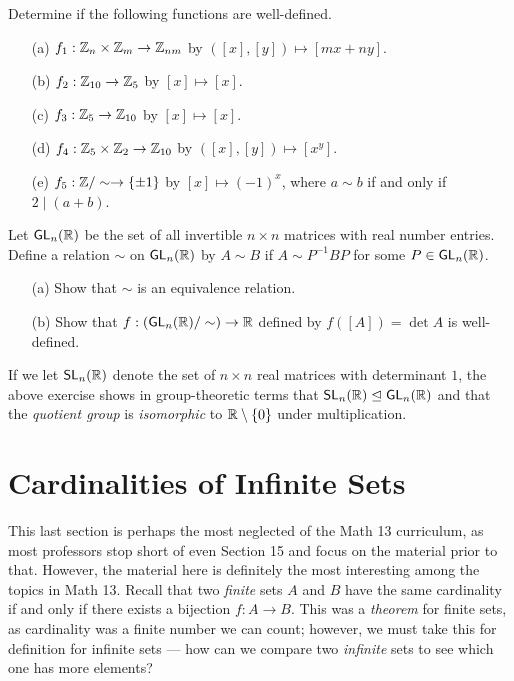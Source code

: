 \documentclass{article}
\begin{document}
\begin{exercise}
Determine if the following functions are well-defined.
\begin{itemize}
    \item[(a)] $f_1: \mathbb Z_n\times \mathbb Z_m \to \mathbb Z_{nm}$ by $([x], [y]) \mapsto [mx+ny]$.
    \item[(b)] $f_2: \mathbb Z_{10}\to\mathbb Z_5$ by $[x]\mapsto [x]$.
    \item[(c)] $f_3: \mathbb Z_5\to\mathbb Z_{10}$ by $[x]\mapsto [x]$.
    \item[(d)] $f_4: \mathbb Z_5\times\mathbb Z_2\to\mathbb Z_{10}$ by $([x], [y])\mapsto [x^y]$.
    \item[(e)] $f_5: \mathbb Z/\sim \to \{\pm 1\}$ by $[x] \mapsto (-1)^x$, where $a\sim b$ if and only if $2\mid (a+b)$.
\end{itemize}
\end{exercise}
\begin{exercise}
Let $\mathsf{GL}_n(\mathbb R)$ be the set of all invertible $n\times n$ matrices with real number entries. Define a relation $\sim$ on $\mathsf{GL}_n(\mathbb R)$ by $A\sim B$ if $A\sim P^{-1}BP$ for some $P\in \mathsf{GL}_n(\mathbb R)$.
\begin{itemize}
    \item[(a)] Show that $\sim$ is an equivalence relation.
    \item[(b)] Show that $f: (\mathsf{GL}_n(\mathbb R)/\sim) \to \mathbb R$ defined by $f([A]) = \det A$ is well-defined.
\end{itemize}
If we let $\mathsf{SL}_n(\mathbb R)$ denote the set of $n\times n$ real matrices with determinant $1$, the above exercise shows in group-theoretic terms that $\mathsf{SL}_n(\mathbb R) \trianglelefteq \mathsf{GL}_n(\mathbb R)$ and that the \textit{quotient group} is \textit{isomorphic} to $\mathbb R\setminus\{0\}$ under multiplication.
\end{exercise}

\section{Cardinalities of Infinite Sets}
This last section is perhaps the most neglected of the Math 13 curriculum, as most professors stop short of even Section 15 and focus on the material prior to that. However, the material here is definitely the most interesting among the topics in Math 13. Recall that two \textit{finite} sets $A$ and $B$ have the same cardinality if and only if there exists a bijection $f: A\to B$. This was a \textit{theorem} for finite sets, as cardinality was a finite number we can count; however, we must take this for definition for infinite sets --- how can we compare two \textit{infinite} sets to see which one has more elements?
\end{document}
